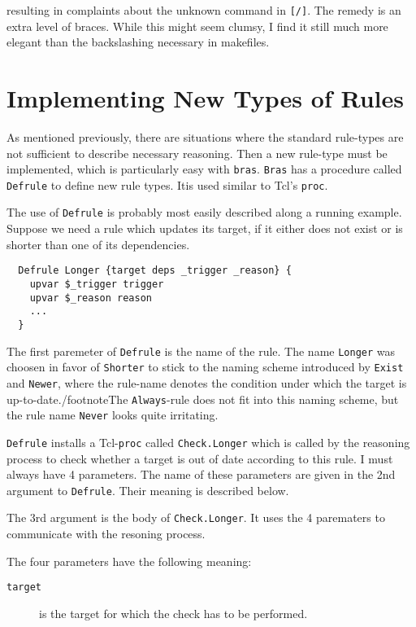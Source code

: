 \documentclass[12pt]{article}
\newcommand{\bras}{\texttt{bras}}
\newcommand{\Bras}{\texttt{Bras}}
\begin{document}
{resulting in complaints about the unknown command in
\texttt{[/]}. The remedy is an extra level of braces. While this might
seem clumsy, I find it still much more elegant than the backslashing
necessary in makefiles.


\section{Implementing New Types of Rules}
\label{secNewRules}
As mentioned previously, there are situations where the standard
rule-types are not sufficient to describe necessary reasoning. Then a
new rule-type must be implemented, which is particularly easy with
\bras{}. \Bras{} has a procedure called
\texttt{Defrule} to define new rule types. Itis used similar to Tcl's
\texttt{proc}.

The use of \texttt{Defrule} is probably most easily described along a
running example. Suppose we need a rule which updates its target, if
it either does not exist or is shorter than one of its dependencies.

\begin{verbatim}
  Defrule Longer {target deps _trigger _reason} {
    upvar $_trigger trigger
    upvar $_reason reason
    ...
  }
\end{verbatim}

The first paremeter of \texttt{Defrule} is the name of the
rule. The name \texttt{Longer} was choosen in favor of \texttt{Shorter}
to stick to the naming scheme introduced by \texttt{Exist} and
\texttt{Newer}, where the rule-name denotes the condition under which
the target is up-to-date./footnote{The \texttt{Always}-rule does not
fit into this naming scheme, but the rule name \texttt{Never} looks
quite irritating}.

\texttt{Defrule} installs a Tcl-\texttt{proc} called
\texttt{Check.Longer} which is called by the reasoning process to
check whether a target is out of date according to this rule. I must
always have 4 parameters. The name of these parameters are given in
the 2nd argument to \texttt{Defrule}. Their meaning is described below.

The 3rd argument is the body of \texttt{Check.Longer}. It uses the 4
parematers to communicate with the resoning process.

The four parameters have the following meaning:

\begin{description}
\item[\texttt{target}]
is the target for which the check has to be
performed. 


\end{description}}
\end{document}
